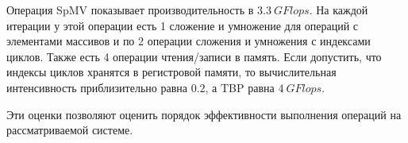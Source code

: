 \documentclass[12pt, oneside, a4paper]{article}
\begin{document}
Операция SpMV показывает производительность в $3.3\ GFlops$. На каждой итерации у этой операции есть 1 сложение и умножение для операций с элементами массивов и по 2 операции сложения и умножения с индексами циклов. Также есть 4 операции чтения/записи в память. Если допустить, что индексы циклов хранятся в регистровой памяти, то вычислительная интенсивность приблизительно равна $0.2$, а TBP равна $4\ GFlops$.

Эти оценки позволяют оценить порядок эффективности выполнения операций на рассматриваемой системе.
\end{document}
